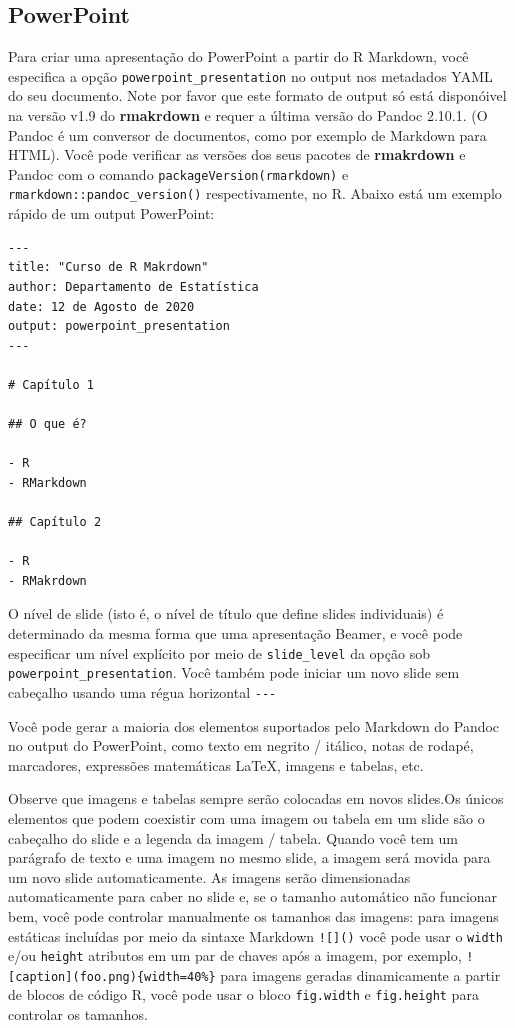\documentclass[
]{book}
\begin{document}
\hypertarget{powerpoint}{%
\subsection{PowerPoint}\label{powerpoint}}

Para criar uma apresentação do PowerPoint a partir do R Markdown, você especifica a opção \texttt{powerpoint\_presentation} no output nos metadados YAML do seu documento. Note por favor que este formato de output só está disponóivel na versão v1.9 do \textbf{rmakrdown} e requer a última versão do Pandoc 2.10.1. (O Pandoc é um conversor de documentos, como por exemplo de Markdown para HTML). Você pode verificar as versões dos seus pacotes de \textbf{rmakrdown} e Pandoc com o comando \texttt{packageVersion(\textquotesingle{}rmarkdown\textquotesingle{})} e \texttt{rmarkdown::pandoc\_version()} respectivamente, no R.
Abaixo está um exemplo rápido de um output PowerPoint:

\begin{verbatim}
---
title: "Curso de R Makrdown"
author: Departamento de Estatística
date: 12 de Agosto de 2020
output: powerpoint_presentation
---

# Capítulo 1

## O que é?

- R
- RMarkdown

## Capítulo 2

- R
- RMakrdown
\end{verbatim}

O nível de slide (isto é, o nível de título que define slides individuais) é determinado da mesma forma que uma apresentação Beamer, e você pode especificar um nível explícito por meio de \texttt{slide\_level} da opção sob \texttt{powerpoint\_presentation}. Você também pode iniciar um novo slide sem cabeçalho usando uma régua horizontal \texttt{-\/-\/-}

Você pode gerar a maioria dos elementos suportados pelo Markdown do Pandoc no output do PowerPoint, como texto em negrito / itálico, notas de rodapé, marcadores, expressões matemáticas LaTeX, imagens e tabelas, etc.

Observe que imagens e tabelas sempre serão colocadas em novos slides.Os únicos elementos que podem coexistir com uma imagem ou tabela em um slide são o cabeçalho do slide e a legenda da imagem / tabela. Quando você tem um parágrafo de texto e uma imagem no mesmo slide, a imagem será movida para um novo slide automaticamente. As imagens serão dimensionadas automaticamente para caber no slide e, se o tamanho automático não funcionar bem, você pode controlar manualmente os tamanhos das imagens: para imagens estáticas incluídas por meio da sintaxe Markdown \texttt{!{[}{]}()} você pode usar o \texttt{width} e/ou \texttt{height} atributos em um par de chaves após a imagem, por exemplo, \texttt{!{[}caption{]}(foo.png)\{width=40\%\}} para imagens geradas dinamicamente a partir de blocos de código R, você pode usar o bloco \texttt{fig.width} e \texttt{fig.height} para controlar os tamanhos.
\end{document}
